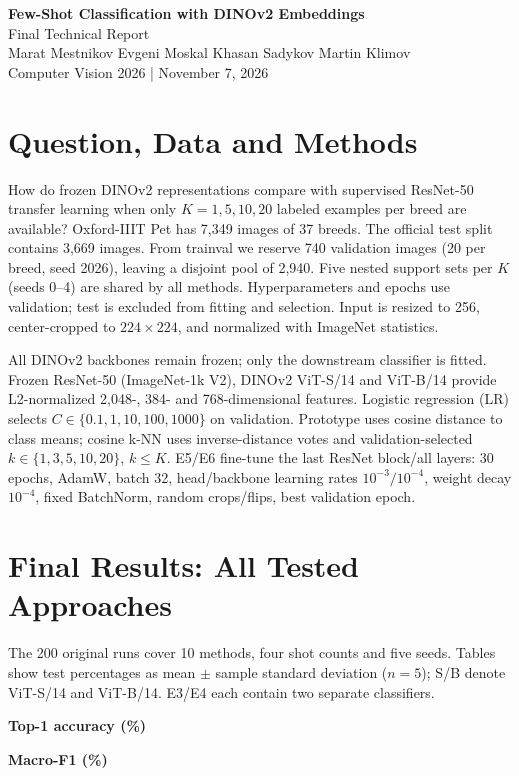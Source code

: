 \documentclass[10pt]{article}
\begin{document}
\begin{center}
{\Large\bfseries Few-Shot Classification with DINOv2 Embeddings}\\[3pt]
{\normalsize Final Technical Report}\\[3pt]
Marat Mestnikov \quad Evgeni Moskal \quad Khasan Sadykov \quad Martin Klimov\\
{\small Computer Vision 2026 \enspace | \enspace November 7, 2026}
\end{center}
\vspace{-7pt}
\section{Question, Data and Methods}
How do frozen DINOv2 representations compare with supervised ResNet-50 transfer
learning when only $K=1,5,10,20$ labeled examples per breed are available?
Oxford-IIIT Pet has 7,349 images of 37 breeds. The official test split contains
3,669 images. From trainval we reserve 740 validation images (20 per breed,
seed 2026), leaving a disjoint pool of 2,940. Five nested support sets per $K$
(seeds 0--4) are shared by all methods. Hyperparameters and epochs use validation;
test is excluded from fitting and selection. Input is resized to 256, center-cropped
to $224\times224$, and normalized with ImageNet statistics.

All DINOv2 backbones remain frozen; only the downstream classifier is fitted.
Frozen ResNet-50 (ImageNet-1k V2), DINOv2 ViT-S/14 and ViT-B/14 provide L2-normalized
2,048-, 384- and 768-dimensional features. Logistic regression (LR) selects
$C\in\{0.1,1,10,100,1000\}$ on validation. Prototype uses cosine distance to class
means; cosine k-NN uses inverse-distance votes and validation-selected
$k\in\{1,3,5,10,20\}$, $k\leq K$. E5/E6 fine-tune the last ResNet block/all layers:
30 epochs, AdamW, batch 32, head/backbone learning rates $10^{-3}/10^{-4}$,
weight decay $10^{-4}$, fixed BatchNorm, random crops/flips, best validation epoch.

\section{Final Results: All Tested Approaches}
The 200 original runs cover 10 methods, four shot counts and five seeds.
Tables show test percentages as mean $\pm$ sample standard deviation ($n=5$);
S/B denote ViT-S/14 and ViT-B/14. E3/E4 each contain two separate classifiers.
\begin{center}
\textbf{Top-1 accuracy (\%)}\\[2pt]
{\small}
\end{center}
\vspace{-7pt}
\begin{center}
\textbf{Macro-F1 (\%)}\\[2pt]
{\small}
\end{center}
\vspace{-7pt}
\end{document}
